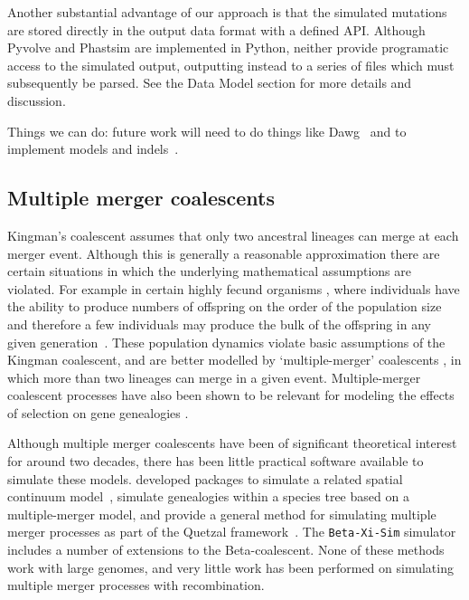 \documentclass{article}
\begin{document}
Another substantial advantage of our approach is that the simulated
mutations are stored directly in the output data format with
a defined API. Although
Pyvolve and Phastsim are implemented in Python, neither provide
programatic access to the simulated output, outputting instead
to a series of files which must subsequently be parsed.
See the Data Model section for more details and discussion.

Things we can do: future work will need to do things like
Dawg~\citep{cartwright2005dna} and to implement models and
indels~\citep{fletcher2009indelible}.

\subsection*{Multiple merger coalescents}

Kingman's coalescent assumes that only two ancestral lineages can merge at
each merger event. Although this is generally a reasonable approximation there
are certain situations in which the underlying mathematical assumptions are
violated. For example in certain highly fecund organisms
\citep{hedgecock_94,B94,HP11,A04,irwin16}, where individuals have the ability
to produce numbers of offspring on the order of the population size and
therefore a few individuals may produce the bulk of the offspring in any given
generation~\citep{hedgecock_94}. These population dynamics violate basic
assumptions of the Kingman coalescent, and are better modelled by
`multiple-merger' coalescents \citep{DK99,P99,S99,S00,MS01}, in which more than
two lineages can merge in a given event. Multiple-merger coalescent processes
have also been shown to be relevant for modeling the effects of selection on
gene genealogies \citep{Gillespie909,DS04}.

Although multiple merger coalescents have been of significant theoretical
interest for around two decades, there has been little practical software
available to simulate these models.
\cite{kelleher2013coalescent,kelleher2014coalescent} developed packages to
simulate a related spatial continuum model~\citep{barton2010new},
\cite{zhu2015hybrid} simulate genealogies within a species tree
based on a multiple-merger model, and
\cite{becheler2020occupancy} provide a general method for simulating
multiple merger processes
as part of the Quetzal framework~\citep{becheler2019quetzal}.
The \texttt{Beta-Xi-Sim} simulator~\citep{koskela2018multi,koskela2019robust}
includes a number of extensions to the Beta-coalescent.
None of these methods work with large genomes, and very little work
has been performed on simulating multiple merger processes with recombination.
\end{document}

